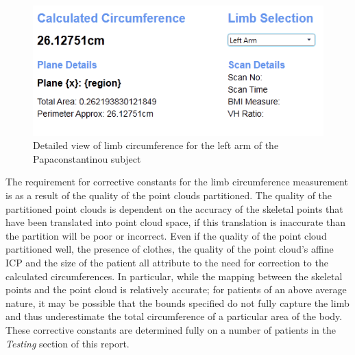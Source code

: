 \begin{figure}
\begin{center}
    \includegraphics[scale=0.6]{zscreenshots/limbdetails.png}
    \caption{Detailed view of limb circumference for the left arm of the Papaconstantinou subject}
\end{center}
\end{figure}


The requirement for corrective constants for the limb circumference measurement is as a result of the quality of the point clouds partitioned. The quality of the partitioned point clouds is dependent on the accuracy of the skeletal points that have been translated into point cloud space, if this translation is inaccurate than the partition will be poor or incorrect. Even if the quality of the point cloud partitioned well, the presence of clothes, the quality of the point cloud's affine ICP and the size of the patient all attribute to the need for correction to the calculated circumferences. In particular, while the mapping between the skeletal points and the point cloud is relatively accurate; for patients of an above average nature, it may be possible that the bounds specified do not fully capture the limb and thus underestimate the total circumference of a particular area of the body. These corrective constants are determined fully on a number of patients in the \emph{Testing} section of this report.
